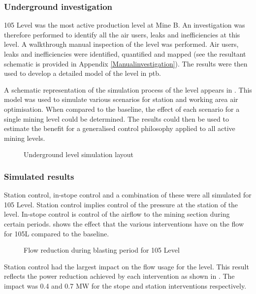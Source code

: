 	\subsubsection{Underground investigation}
	105 Level was the most active production level at Mine B. An investigation was therefore performed to identify all the air users, leaks and inefficiencies at this level. A walkthrough manual inspection of the level was performed. Air users, leaks and inefficiencies were identified, quantified and mapped (see the resultant schematic is provided in Appendix \ref{Manualinvestigation}). The results were then used to develop a detailed model of the level in \gls{ptb}. 
	\par 
	A schematic representation of the simulation process of the level appears in . This model was used to simulate various scenarios for station and working area air optimisation. When compared to the baseline, the effect of each scenario for a single mining level could be determined. The results could then be used to estimate the benefit for a generalised control philosophy applied to all active mining levels.
	\begin{figure}[h!]
		\centering
		\caption{Underground level simulation layout}
		\label{fig: KUS Simulation level layout}
	\end{figure}	
	\clearpage
	\subsubsection{Simulated results}
	Station control, in-stope control and a combination of these were all simulated for 105 Level. Station control implies control of the pressure at the station of the level. In-stope control is control of the airflow to the mining section during certain periods.  shows the effect that the various interventions have on the flow for 105L compared to the baseline.

	\begin{figure}[h!]
		\centering
		
		\caption{Flow reduction during blasting period for 105 Level}
		\label{fig: 105 Flow savings}
	\end{figure}
Station control had the largest impact on the flow usage for the level. This result reflects the power reduction achieved by each intervention as shown in . The impact was 0.4 and 0.7 MW for the stope and station interventions respectively.
	
